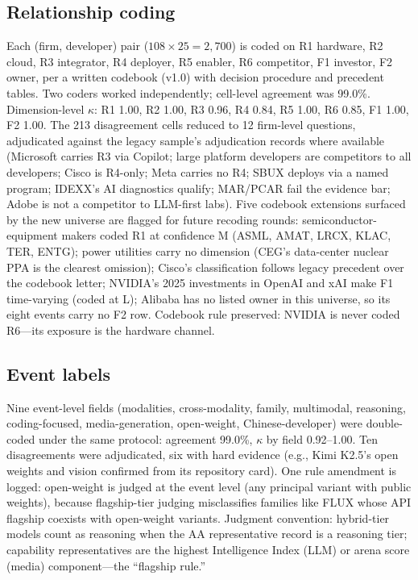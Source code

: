 \documentclass[review,12pt,authoryear]{elsarticle}
\begin{document}
\subsection{Relationship coding}
Each (firm, developer) pair ($108 \times 25 = 2{,}700$) is coded on R1
hardware, R2 cloud, R3 integrator, R4 deployer, R5 enabler, R6 competitor,
F1 investor, F2 owner, per a written codebook (v1.0) with decision procedure
and precedent tables. Two coders worked independently; cell-level agreement
was 99.0\%. Dimension-level $\kappa$: R1 1.00, R2 1.00, R3 0.96, R4 0.84,
R5 1.00, R6 0.85, F1 1.00, F2 1.00. The 213 disagreement cells reduced to 12
firm-level questions, adjudicated against the legacy sample's adjudication
records where available (Microsoft carries R3 via Copilot; large platform
developers are competitors to all developers; Cisco is R4-only; Meta carries
no R4; SBUX deploys via a named program; IDEXX's AI diagnostics qualify;
MAR/PCAR fail the evidence bar; Adobe is not a competitor to LLM-first labs).
Five codebook extensions surfaced by the new universe are flagged for future
recoding rounds: semiconductor-equipment makers coded R1 at confidence M
(ASML, AMAT, LRCX, KLAC, TER, ENTG); power utilities carry no dimension
(CEG's data-center nuclear PPA is the clearest omission); Cisco's
classification follows legacy precedent over the codebook letter; NVIDIA's
2025 investments in OpenAI and xAI make F1 time-varying (coded at L);
Alibaba has no listed owner in this universe, so its eight events carry no
F2 row. Codebook rule preserved: NVIDIA is never coded R6---its exposure
is the hardware channel.

\subsection{Event labels}
Nine event-level fields (modalities, cross-modality, family, multimodal,
reasoning, coding-focused, media-generation, open-weight, Chinese-developer)
were double-coded under the same protocol: agreement 99.0\%, $\kappa$ by
field 0.92--1.00. Ten disagreements were adjudicated, six with hard evidence
(e.g., Kimi K2.5's open weights and vision confirmed from its repository
card). One rule amendment is logged: open-weight is judged at the event
level (any principal variant with public weights), because flagship-tier
judging misclassifies families like FLUX whose API flagship coexists with
open-weight variants. Judgment convention: hybrid-tier models count as
reasoning when the AA representative record is a reasoning tier; capability
representatives are the highest Intelligence Index (LLM) or arena score
(media) component---the ``flagship rule.''
\end{document}

